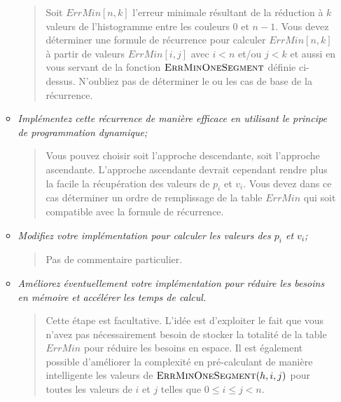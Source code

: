 \documentclass[a4paper,10pt]{article}
\begin{document}
\begin{itemize}
\begin{itemize}
\bigskip

\begin{quote}
Soit $ErrMin[n,k]$ l'erreur minimale résultant de la réduction à $k$
valeurs de l'histogramme entre les couleurs 0 et $n-1$. Vous devez
déterminer une formule de récurrence pour calculer $ErrMin[n,k]$ à
partir de valeurs $ErrMin[i,j]$ avec $i<n$ et/ou $j<k$ et aussi en
vous servant de la fonction $\textnormal{\scshape ErrMinOneSegment}$ définie
ci-dessus. N'oubliez pas de déterminer le ou les cas de base de la
récurrence.

\end{quote}

\bigskip

\item {\it Implémentez cette récurrence de manière efficace en
  utilisant le principe de programmation dynamique;}

\bigskip

\begin{quote}
Vous pouvez choisir soit l'approche descendante, soit l'approche
ascendante. L'approche ascendante devrait cependant rendre plus la
facile la récupération des valeurs de $p_i$ et $v_i$. Vous devez dans
ce cas déterminer un ordre de remplissage de la table $ErrMin$ qui
soit compatible avec la formule de récurrence.
\end{quote}

\bigskip

\item {\it Modifiez votre implémentation pour calculer les valeurs des
  $p_i$ et $v_i$;}

\bigskip

\begin{quote}
Pas de commentaire particulier.
\end{quote}

\bigskip

\item {\it Améliorez éventuellement votre implémentation pour réduire les
  besoins en mémoire et accélérer les temps de calcul.}

\bigskip

\begin{quote}
Cette étape est facultative. L'idée est d'exploiter le fait que vous
n'avez pas nécessairement besoin de stocker la totalité de la table
$ErrMin$ pour réduire les besoins en espace. Il est également possible
d'améliorer la complexité en pré-calculant de manière intelligente les
valeurs de $\textnormal{\scshape ErrMinOneSegment}(h,i,j)$ pour toutes les valeurs de
$i$ et $j$ telles que $0\leq i\leq j< n$.
\end{quote}

\bigskip

\end{itemize}

\end{itemize}
\end{document}
